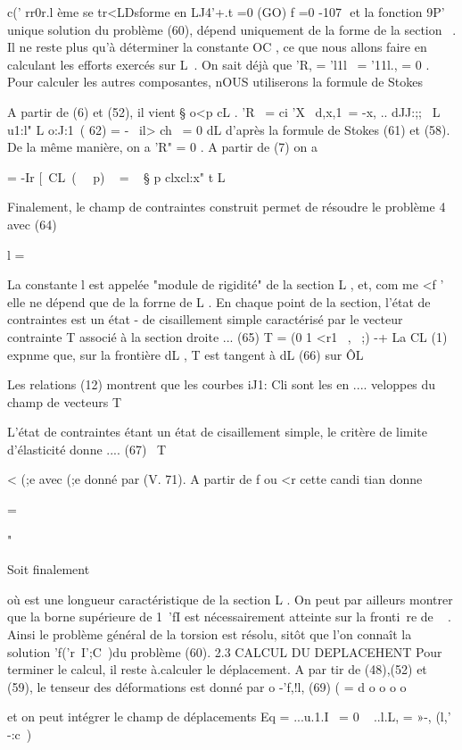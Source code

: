 {c(' rr0r.l ème se tr<LDsforme en 
LJ4'+.t =0 
(GO) f 
=0 
-107 ­
et la fonction 9P' unique solution du problème (60), dépend uniquement de la forme de la section ~. 
Il ne reste plus qu'à déterminer la constante OC , ce que nous al­lons faire en calculant les efforts exercés sur L~. On sait déjà que 'R, = 'l1l~ = '11l., = 0 . Pour calculer les autres composantes, nOUS utiliserons la formule de Stokes 

A partir de (6) et (52), il vient 
§ o<p cL .
'R~ = ci 'X~ d,x,1\ = -x, .. dJJ:;;
~L u1:l" 
L o:J:1\
( 62) = -~ il> ch~ = 0 
dL 
d'après la formule de Stokes (61) et (58). De la même manière, on a 'R" = 0 . A partir de (7) on a 

= -Ir [~CL~(~~ p) ~ 
= ~ § p clxcl:x"
t
L 


Finalement, le champ de contraintes construit permet de résoudre le problème 4 avec 
(64) 

l = 

La constante l est appelée "module de rigidité" de la section L , et, com­
me <f ' elle ne dépend que de la forrne de L . 
En chaque point de la section, l'état de contraintes est un état
-
de cisaillement simple caractérisé par le vecteur contrainte T associé à la section droite 
... 
(65) 
T = (0 1 <r1~ , ~;) 
-+ 
La CL (1) expnme que, sur la frontière dL , T est tangent à dL 
(66) sur ÔL 

Les relations (12) montrent que les courbes iJ1: Cli sont les en­
.... 
veloppes du champ de vecteurs T 

L'état de contraintes étant un état de cisaillement simple, le critère de limite d'élasticité donne 
.... 
(67) \ T \ ~ 

< (;e 
avec (;e donné par (V. 71). A partir de f ou <r cette candi tian donne 

= 

" 

Soit finalement 

où est une longueur caractéristique de la section L . On peut par ail­leurs montrer que la borne supérieure de 1~'fI est nécessairement atteinte sur la fronti~re de ~ . Ainsi le problème général de la torsion est résolu, sitôt que l'on connaît la solution 'f('r~I';C~)du problème (60). 
2.3 CALCUL DU DEPLACEHENT 
Pour terminer le calcul, il reste à.calculer le déplacement. A par­
tir de (48),(52) et (59), le tenseur des déformations est donné par 
o 
-'f,!l, 
(69) ( = d o o o o 

et on peut intégrer le champ de déplacements 
Eq = ...u.1.I~ = 0 ~ ..l.L, = »-, (l,' -:c~) 

}
